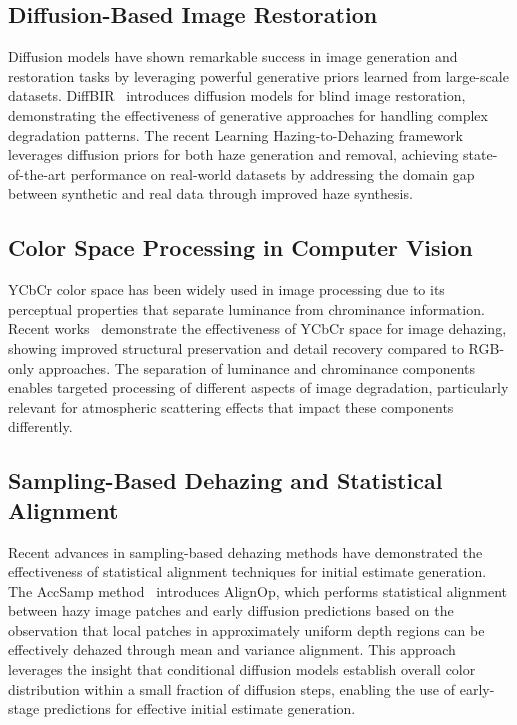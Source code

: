 \documentclass{article}
\begin{document}
\subsection{Diffusion-Based Image Restoration}

Diffusion models have shown remarkable success in image generation and restoration tasks by leveraging powerful generative priors learned from large-scale datasets. DiffBIR~\cite{lin2023diffbir} introduces diffusion models for blind image restoration, demonstrating the effectiveness of generative approaches for handling complex degradation patterns. The recent Learning Hazing-to-Dehazing framework~\cite{wang2025learning} leverages diffusion priors for both haze generation and removal, achieving state-of-the-art performance on real-world datasets by addressing the domain gap between synthetic and real data through improved haze synthesis.

\subsection{Color Space Processing in Computer Vision}

YCbCr color space has been widely used in image processing due to its perceptual properties that separate luminance from chrominance information. Recent works~\cite{fang2025guided} demonstrate the effectiveness of YCbCr space for image dehazing, showing improved structural preservation and detail recovery compared to RGB-only approaches. The separation of luminance and chrominance components enables targeted processing of different aspects of image degradation, particularly relevant for atmospheric scattering effects that impact these components differently.

\subsection{Sampling-Based Dehazing and Statistical Alignment}

Recent advances in sampling-based dehazing methods have demonstrated the effectiveness of statistical alignment techniques for initial estimate generation. The AccSamp method~\cite{wang2025learning} introduces AlignOp, which performs statistical alignment between hazy image patches and early diffusion predictions based on the observation that local patches in approximately uniform depth regions can be effectively dehazed through mean and variance alignment. This approach leverages the insight that conditional diffusion models establish overall color distribution within a small fraction of diffusion steps, enabling the use of early-stage predictions for effective initial estimate generation.
\end{document}
